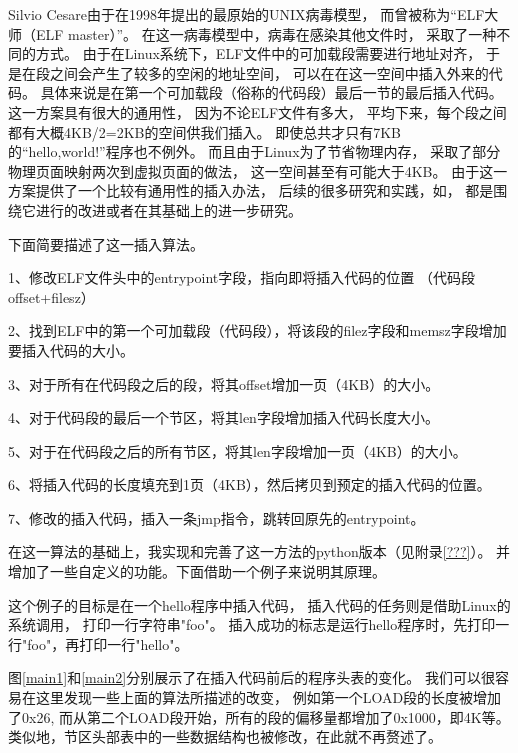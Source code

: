 Silvio Cesare由于在1998年提出的最原始的UNIX病毒模型，
而曾被称为“ELF大师（ELF master）”。
在这一病毒模型中，病毒在感染其他文件时，
采取了一种不同的方式。
由于在Linux系统下，ELF文件中的可加载段需要进行地址对齐，
于是在段之间会产生了较多的空闲的地址空间，
可以在在这一空间中插入外来的代码。
具体来说是在第一个可加载段（俗称的代码段）最后一节的最后插入代码。
这一方案具有很大的通用性，
因为不论ELF文件有多大，
平均下来，每个段之间都有大概4KB/2=2KB的空间供我们插入。
即使总共才只有7KB的“hello,world!”程序也不例外。
而且由于Linux为了节省物理内存，
采取了部分物理页面映射两次到虚拟页面的做法，
这一空间甚至有可能大于4KB。
由于这一方案提供了一个比较有通用性的插入办法，
后续的很多研究和实践，如\cite{simple,shared,cerberus,subversive,prototype}，
都是围绕它进行的改进或者在其基础上的进一步研究。

下面简要描述了这一插入算法。


1、修改ELF文件头中的entrypoint字段，指向即将插入代码的位置
（代码段offset+filesz）

2、找到ELF中的第一个可加载段（代码段），将该段的filez字段和memsz字段增加
要插入代码的大小。

3、对于所有在代码段之后的段，将其offset增加一页（4KB）的大小。

4、对于代码段的最后一个节区，将其len字段增加插入代码长度大小。

5、对于在代码段之后的所有节区，将其len字段增加一页（4KB）的大小。

6、将插入代码的长度填充到1页（4KB），然后拷贝到预定的插入代码的位置。

7、修改的插入代码，插入一条jmp指令，跳转回原先的entrypoint。

在这一算法的基础上，我实现和完善了这一方法的python版本（见附录\ref{???}）。
并增加了一些自定义的功能。下面借助一个例子来说明其原理。

这个例子的目标是在一个hello程序中插入代码，
插入代码的任务则是借助Linux的系统调用，
打印一行字符串"foo"。
插入成功的标志是运行hello程序时，先打印一行"foo"，再打印一行"hello"。

图\ref{main1}和\ref{main2}分别展示了在插入代码前后的程序头表的变化。
我们可以很容易在这里发现一些上面的算法所描述的改变，
例如第一个LOAD段的长度被增加了0x26,
而从第二个LOAD段开始，所有的段的偏移量都增加了0x1000，即4K等。
类似地，节区头部表中的一些数据结构也被修改，在此就不再赘述了。

